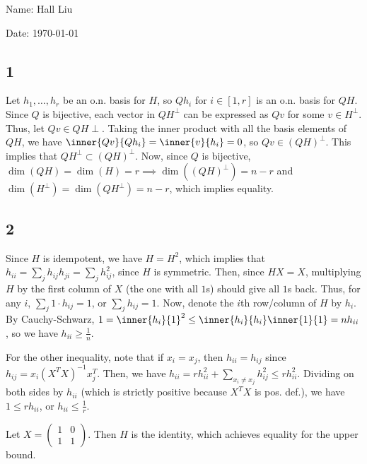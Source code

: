 \documentclass{article}
\newcommand{\openm}{\begin{pmatrix}}
\newcommand{\closem}{\end{pmatrix}}
\begin{document}
Name: Hall Liu

Date: \today 
\vspace{1.5cm}
\subsection*{1}
Let $h_1,\ldots,h_r$ be an o.n. basis for $H$, so $Qh_i$ for $i\in[1,r]$ is an o.n. basis for $QH$. Since $Q$ is bijective, each vector in $QH^\perp$ can be expressed as $Qv$ for some $v\in H^\perp$. Thus, let $Qv\in QH\perp$. Taking the inner product with all the basis elements of $QH$, we have $\inner{Qv}{Qh_i}=\inner{v}{h_i}=0$, so $Qv\in(QH)^\perp$. This implies that $QH^\perp\subset(QH)^\perp$. Now, since $Q$ is bijective, $\dim(QH)=\dim(H)=r\implies\dim((QH)^\perp)=n-r$ and $\dim(H^\perp)=\dim(QH^\perp)=n-r$, which implies equality.
\subsection*{2}
Since $H$ is idempotent, we have $H=H^2$, which implies that $h_{ii}=\sum_jh_{ij}h_{ji}=\sum_jh_{ij}^2$, since $H$ is symmetric. Then, since $HX=X$, multiplying $H$ by the first column of $X$ (the one with all $1$s) should give all $1$s back. Thus, for any $i$, $\sum_j1\cdot h_{ij}=1$, or $\sum_j h_{ij}=1$. Now, denote the $i$th row/column of $H$ by $h_i$. By Cauchy-Schwarz, $1=\inner{h_i}{1}^2\leq\inner{h_i}{h_i}\inner{1}{1}=nh_{ii}$, so we have $h_{ii}\geq\frac{1}{n}$.

For the other inequality, note that if $x_i=x_j$, then $h_{ii}=h_{ij}$ since $h_{ij}=x_i(X^TX)^{-1}x_j^T$. Then, we have $h_{ii}=rh_{ii}^2+\sum_{x_i\neq x_j}h_{ij}^2\leq rh_{ii}^2$. Dividing on both sides by $h_{ii}$ (which is strictly positive because $X^TX$ is pos. def.), we have $1\leq rh_{ii}$, or $h_{ii}\leq\frac{1}{r}$.

Let $X=\openm1&0\\1&1\closem$. Then $H$ is the identity, which achieves equality for the upper bound.
\end{document}
